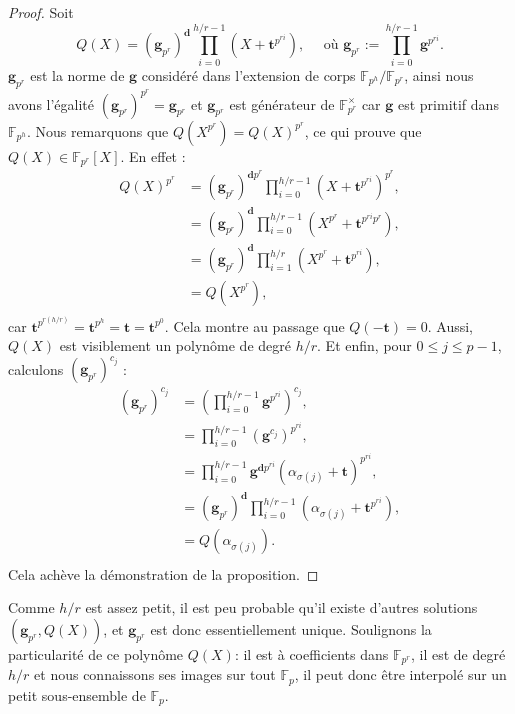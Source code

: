 \documentclass[a4paper, titlepage, 11pt]{article}
\theoremstyle{definition}
\theoremstyle{remark}
\def\gf #1{\mathbb{F}_{#1}}
\def\mbf #1{\mathbf{#1}}
\newcommand{\extension}[2]{{#1} / {#2}} %
\begin{document}
\begin{proof}
Soit
$$Q(X) = (\mbf g_{p^r})^{\mbf d} \prod_{i=0}^{h/r-1} \left(X+\mbf t^{p^{ri}}\right),
\quad \text{ où } \mbf g_{p^r} := \prod_{i=0}^{h/r-1} \mbf g^{p^{ri}}.$$
$\mbf g_{p^r}$ est la norme de $\mbf g$ considéré dans l'extension de corps $\extension{\gf{p^h}}{\gf{p^r}}$, ainsi nous avons l'égalité $(\mbf g_{p^r})^{p^r} = \mbf g_{p^r}$ et $\mbf g_{p^r}$ est générateur de $\gf{p^r}^\times$ car $\mbf g$ est primitif dans $\gf{p^h}$. Nous remarquons que $Q\left(X^{p^r}\right) = Q(X)^{p^r}$, ce qui prouve que $Q(X) \in \gf{p^r}[X]$. En effet :
\begin{align*}
Q\left(X\right)^{p^r} &= (\mbf g_{p^r})^{\mbf dp^r} \prod_{i=0}^{h/r-1} \left(X+\mbf t^{p^{ri}}\right)^{p^r}, \\
&= (\mbf g_{p^r})^{\mbf d} \prod_{i=0}^{h/r-1} \left(X^{p^r} + \mbf t^{p^{ri}p^r}\right), \\
&= (\mbf g_{p^r})^{\mbf d} \prod_{i=1}^{h/r} \left(X^{p^r} + \mbf t^{p^{ri}}\right), \\
&= Q\left(X^{p^r}\right), \\
\end{align*}
car $\mbf t^{p^{r(h/r)}} = \mbf t^{p^h} = \mbf t = \mbf t^{p^0}$. Cela montre au passage que $Q(-\mbf t) = 0$. Aussi, $Q(X)$ est visiblement un polynôme de degré $h/r$. Et enfin, pour $0\leqslant j \leqslant p-1$, calculons $(\mbf g_{p^r})^{c_j}$ :
\begin{align*}
(\mbf g_{p^r})^{c_j} &= \left(\prod_{i=0}^{h/r-1} \mbf g^{p^{ri}}\right)^{c_j},\\
&= \prod_{i=0}^{h/r-1} \left(\mbf g^{c_j}\right)^{p^{ri}}, \\
&= \prod_{i=0}^{h/r-1} \mbf g^{\mbf dp^{ri}}\left(\alpha_{\sigma(j)} + \mbf t\right)^{p^{ri}},\\
&= (\mbf g_{p^r})^{\mbf d} \prod_{i=0}^{h/r-1} \left(\alpha_{\sigma(j)} + \mbf t^{p^{ri}}\right),\\
&= Q\left(\alpha_{\sigma(j)}\right). \\
\end{align*}
Cela achève la démonstration de la proposition.
\end{proof}

Comme $h/r$ est assez petit, il est peu probable qu'il existe d'autres solutions $(\mbf g_{p^r}, Q(X))$, et $\mbf g_{p^r}$ est donc essentiellement unique. Soulignons la particularité de ce polynôme $Q(X)$: il est à coefficients dans $\gf{p^r}$, il est de degré $h/r$ et nous connaissons ses images sur tout $\gf{p}$, il peut donc être interpolé sur un petit sous-ensemble de $\gf{p}$.
\end{document}
